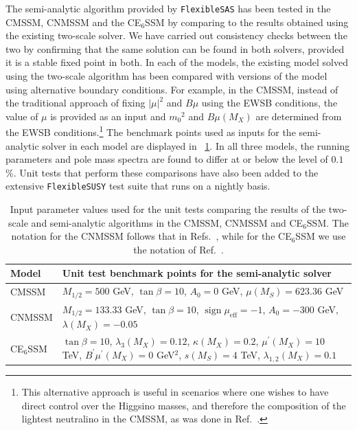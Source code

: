 \documentclass[final,3p,11pt,pdflatex]{elsarticle}
\makeatletter
\newcommand{\fs}{\texttt{FlexibleSUSY}\@\xspace}
\newcommand{\fsas}{\texttt{FlexibleSAS}\@\xspace}
\newcommand{\ESSM}{E$_6$SSM\@\xspace}
\newcommand{\MS}{\ensuremath{M_S}\xspace}
\newcommand{\tabref}[1]{\tablename~\ref{#1}}
\newcommand{\azero}{\ensuremath{A_0}\xspace}
\newcommand{\mhalf}{\ensuremath{M_{1/2}}\xspace}
\newcommand{\mzero}{\ensuremath{m_0}\xspace}
\DeclareMathOperator{\sign}{sign}
\makeatother
\begin{document}
The semi-analytic algorithm provided by \fsas has been tested in the
CMSSM, CNMSSM and the C\ESSM by comparing to the results
obtained using the existing two-scale solver.  We have
carried out consistency checks between the two by confirming that the same
solution can be found in both solvers, provided it is a stable fixed
point in both.  In each of the models, the existing model solved using
the two-scale algorithm has been compared with versions of the model
using alternative boundary conditions.  For example, in the CMSSM,
instead of the traditional approach of fixing $|\mu|^2$ and $B\mu$
using the EWSB conditions, the value of $\mu$ is provided as an input
and $\mzero^2$ and $B\mu(M_X)$ are determined from the EWSB
conditions.\footnote{This alternative approach is useful in scenarios where
  one wishes to have direct control over the Higgsino masses, and therefore
  the composition of the lightest neutralino in the CMSSM, as was done in
  Ref.\ \cite{Athron:2016gor}.}  The benchmark points used as inputs for the
semi-analytic solver in each model are displayed in
\tabref{tab:semi_analytic_bms}.  In all three models, the
running parameters and pole mass spectra are found to differ at or
below the level of $0.1$\%.  Unit tests that perform these
comparisons have also been added to the extensive \fs test suite that
runs on a nightly basis.
%
\begin{table}[tbh]
  \centering
  \begin{tabularx}{\textwidth}{lX}
    \toprule
    Model & Unit test benchmark points for the semi-analytic solver\\
    \midrule
    CMSSM & $\mhalf = 500$ GeV, $\tan\beta = 10$, $\azero = 0$ GeV,
    $\mu(\MS) = 623.36$ GeV\\
    CNMSSM & $\mhalf = 133.33$ GeV, $\tan\beta = 10$,
    $\sign \mu_{\text{eff}} = -1$, $\azero = -300$ GeV, $\lambda(M_X) =-0.05$\\
    C\ESSM & $\tan\beta = 10$, $\lambda_3(M_X) = 0.12$, $\kappa(M_X) = 0.2$,
    $\mu^\prime(M_X) = 10$ TeV, $B^\prime\mu^\prime(M_X) = 0$ GeV$^2$,
    $s(\MS) = 4$ TeV, $\lambda_{1,2}(M_X) = 0.1$\\
    \bottomrule
  \end{tabularx}
  \caption{Input parameter values used for the unit tests comparing the
    results of the two-scale and semi-analytic algorithms in the CMSSM,
    CNMSSM and C\ESSM.  The notation for the CNMSSM follows that in
    Refs.~\cite{Allanach:2013kza,Ellwanger:2009dp}, while for the
    C\ESSM we use the notation of Ref.~\cite{Athron:2009bs}.}
  \label{tab:semi_analytic_bms}
\end{table}
\end{document}
